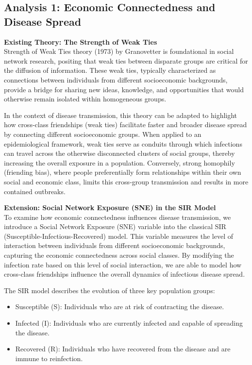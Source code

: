 \documentclass[9 pt]{article} %
\begin{document}
\subsection{Analysis 1: Economic Connectedness and Disease Spread}

\textbf{Existing Theory: The Strength of Weak Ties} \\
Strength of Weak Ties theory (1973) by Granovetter \cite{granovetter1973strength} is foundational in social network research, positing that weak ties between disparate groups are critical for the diffusion of information. These weak ties, typically characterized as connections between individuals from different socioeconomic backgrounds, provide a bridge for sharing new ideas, knowledge, and opportunities that would otherwise remain isolated within homogeneous groups.

In the context of disease transmission, this theory can be adapted to highlight how cross-class friendships (weak ties) facilitate faster and broader disease spread by connecting different socioeconomic groups. When applied to an epidemiological framework, weak ties serve as conduits through which infections can travel across the otherwise disconnected clusters of social groups, thereby increasing the overall exposure in a population. Conversely, strong homophily (friending bias), where people preferentially form relationships within their own social and economic class, limits this cross-group transmission and results in more contained outbreaks.

\textbf{Extension: Social Network Exposure (SNE) in the SIR Model} \\
To examine how economic connectedness influences disease transmission, we introduce a Social Network Exposure (SNE) variable into the classical SIR (Susceptible-Infectious-Recovered) model. This variable measures the level of interaction between individuals from different socioeconomic backgrounds, capturing the economic connectedness across social classes. By modifying the infection rate based on this level of social interaction, we are able to model how cross-class friendships influence the overall dynamics of infectious disease spread.

The SIR model \cite{kermack1927contribution} describes the evolution of three key population groups:
\begin{itemize}
    \item Susceptible (S): Individuals who are at risk of contracting the disease.
    \item Infected (I): Individuals who are currently infected and capable of spreading the disease.
    \item Recovered (R): Individuals who have recovered from the disease and are immune to reinfection.
\end{itemize}
\end{document}
